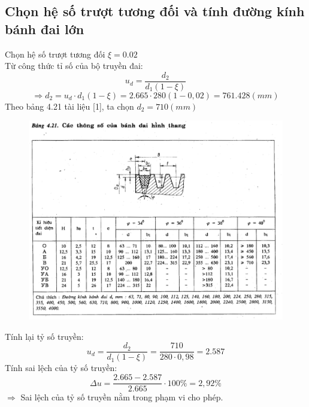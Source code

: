 \subsection{Chọn hệ số trượt tương đối và tính đường kính bánh đai lớn}
Chọn hệ số trượt tương đối $\xi = 0.02$ \\
Từ công thức tỉ số của bộ truyền đai: \\
\[
    u_d = \frac{d_2}{d_1(1 - \xi)}
\]
\[
    \Rightarrow d_2 = u_d \cdot d_1(1 - \xi) = 2.665 \cdot 280(1 - 0,02) = 761.428 (mm)
\]
Theo bảng 4.21 tài liệu [1], ta chọn $d_2 = 710 (mm)$
\begin{figure}[H]
    \centering
    \includegraphics[width=1\textwidth]{pictures/bang4.21.png}
\end{figure}
Tính lại tỷ số truyền:
\[
    u_d = \frac{d_2}{d_1(1 - \xi)} = \frac{710}{280 \cdot 0,98} = 2.587
\]
Tính sai lệch của tỷ số truyền:
\[
    \Delta u = \frac{2.665 - 2.587}{2.665} \cdot 100\% = 2,92\%
\]
$\Rightarrow$ Sai lệch của tỷ số truyền nằm trong phạm vi cho phép.

